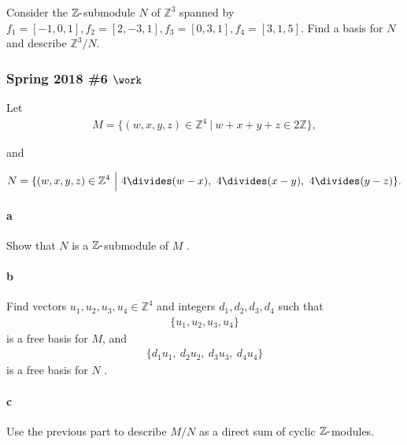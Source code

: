 Consider the \({\mathbb{Z}}{\hbox{-}}\)submodule \(N\) of
\({\mathbb{Z}}^3\) spanned by
\(f_1 = [-1, 0, 1], f_2 = [2,-3,1], f_3 = [0, 3, 1], f_4 = [3,1,5]\).
Find a basis for \(N\) and describe \({\mathbb{Z}}^3/N\).

\hypertarget{spring-2018-6-work}{%
\subsubsection{\texorpdfstring{Spring 2018 \#6
\(\work\)}{Spring 2018 \#6 \textbackslash work}}\label{spring-2018-6-work}}

Let
\begin{align*}
M = \{(w, x, y, z) \in {\mathbb{Z}}^4 {~\mathrel{\Big|}~}w + x + y + z \in 2{\mathbb{Z}}\}
,\end{align*}

and

\begin{align*}
N = \{(w, x, y, z) \in {\mathbb{Z}}^4 {~\mathrel{\Big|}~}4\divides (w - x),~ 4\divides (x - y),~ 4\divides ( y - z)\}
.\end{align*}

\hypertarget{a-85}{%
\paragraph{a}\label{a-85}}

Show that \(N\) is a \({\mathbb{Z}}{\hbox{-}}\)submodule of \(M\) .

\hypertarget{b-75}{%
\paragraph{b}\label{b-75}}

Find vectors \(u_1 , u_2 , u_3 , u_4 \in {\mathbb{Z}}^4\) and integers
\(d_1 , d_2 , d_3 , d_4\) such that
\begin{align*}
\{u_1 , u_2 , u_3 , u_4 \}
\end{align*}
is a free basis for \(M\), and
\begin{align*}
\{d_1 u_1,~ d_2 u_2,~ d_3 u_3,~ d_4 u_4 \}
\end{align*}
is a free basis for \(N\) .

\hypertarget{c-49}{%
\paragraph{c}\label{c-49}}

Use the previous part to describe \(M/N\) as a direct sum of cyclic
\({\mathbb{Z}}{\hbox{-}}\)modules.

